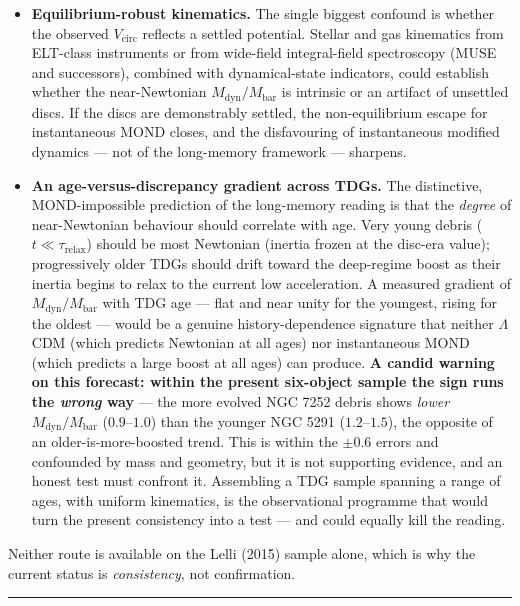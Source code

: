 \documentclass[
]{article}
\providecommand{\tightlist}{%
  \setlength{\itemsep}{0pt}\setlength{\parskip}{0pt}}
\begin{document}
\begin{itemize}
\tightlist
\item
  \textbf{Equilibrium-robust kinematics.} The single biggest confound is
  whether the observed \(V_\mathrm{circ}\) reflects a settled potential.
  Stellar and gas kinematics from ELT-class instruments or from
  wide-field integral-field spectroscopy (MUSE and successors), combined
  with dynamical-state indicators, could establish whether the
  near-Newtonian \(M_\mathrm{dyn}/M_\mathrm{bar}\) is intrinsic or an artifact
  of unsettled discs. If the discs are demonstrably settled, the
  non-equilibrium escape for instantaneous MOND closes, and the
  disfavouring of instantaneous modified dynamics --- not of the
  long-memory framework --- sharpens.
\item
  \textbf{An age-versus-discrepancy gradient across TDGs.} The
  distinctive, MOND-impossible prediction of the long-memory reading is
  that the \emph{degree} of near-Newtonian behaviour should correlate
  with age. Very young debris (\(t\ll\tau_\mathrm{relax}\)) should be most
  Newtonian (inertia frozen at the disc-era value); progressively older
  TDGs should drift toward the deep-regime boost as their inertia begins
  to relax to the current low acceleration. A measured gradient of
  \(M_\mathrm{dyn}/M_\mathrm{bar}\) with TDG age --- flat and near unity for
  the youngest, rising for the oldest --- would be a genuine
  history-dependence signature that neither \(\Lambda\)CDM (which
  predicts Newtonian at all ages) nor instantaneous MOND (which predicts
  a large boost at all ages) can produce. \textbf{A candid warning on
  this forecast: within the present six-object sample the sign runs the
  \emph{wrong} way} --- the more evolved NGC 7252 debris shows
  \emph{lower} \(M_\mathrm{dyn}/M_\mathrm{bar}\) (\(0.9\)--\(1.0\)) than the
  younger NGC 5291 (\(1.2\)--\(1.5\)), the opposite of an
  older-is-more-boosted trend. This is within the \(\pm0.6\) errors and
  confounded by mass and geometry, but it is not supporting evidence,
  and an honest test must confront it. Assembling a TDG sample spanning
  a range of ages, with uniform kinematics, is the observational
  programme that would turn the present consistency into a test --- and
  could equally kill the reading.
\end{itemize}

Neither route is available on the Lelli (2015) sample alone, which is
why the current status is \emph{consistency}, not confirmation.

\begin{center}\rule{0.5\linewidth}{0.5pt}\end{center}
\end{document}
